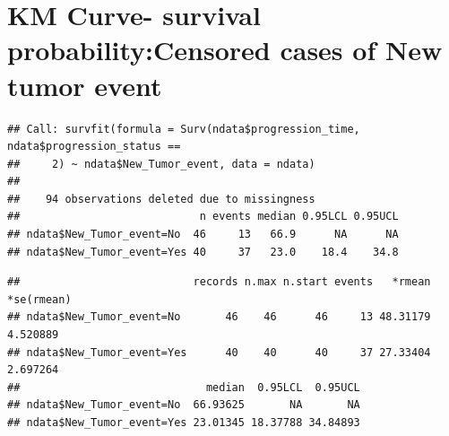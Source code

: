 \documentclass[
  11pt,
]{article}
\newenvironment{Shaded}{\begin{snugshade}}{\end{snugshade}}
\newcommand{\AttributeTok}[1]{\textcolor[rgb]{0.77,0.63,0.00}{#1}}
\newcommand{\DecValTok}[1]{\textcolor[rgb]{0.00,0.00,0.81}{#1}}
\newcommand{\FunctionTok}[1]{\textcolor[rgb]{0.00,0.00,0.00}{#1}}
\newcommand{\NormalTok}[1]{#1}
\newcommand{\OtherTok}[1]{\textcolor[rgb]{0.56,0.35,0.01}{#1}}
\newcommand{\SpecialCharTok}[1]{\textcolor[rgb]{0.00,0.00,0.00}{#1}}
\newcommand{\StringTok}[1]{\textcolor[rgb]{0.31,0.60,0.02}{#1}}
\begin{document}
\newpage
\section{KM Curve- survival probability:Censored cases of New tumor event}

\begin{Shaded}
\end{Shaded}

\begin{verbatim}
## Call: survfit(formula = Surv(ndata$progression_time, ndata$progression_status == 
##     2) ~ ndata$New_Tumor_event, data = ndata)
## 
##    94 observations deleted due to missingness 
##                            n events median 0.95LCL 0.95UCL
## ndata$New_Tumor_event=No  46     13   66.9      NA      NA
## ndata$New_Tumor_event=Yes 40     37   23.0    18.4    34.8
\end{verbatim}

\begin{Shaded}
\end{Shaded}

\begin{verbatim}
##                           records n.max n.start events   *rmean *se(rmean)
## ndata$New_Tumor_event=No       46    46      46     13 48.31179   4.520889
## ndata$New_Tumor_event=Yes      40    40      40     37 27.33404   2.697264
##                             median  0.95LCL  0.95UCL
## ndata$New_Tumor_event=No  66.93625       NA       NA
## ndata$New_Tumor_event=Yes 23.01345 18.37788 34.84893
\end{verbatim}
\end{document}
